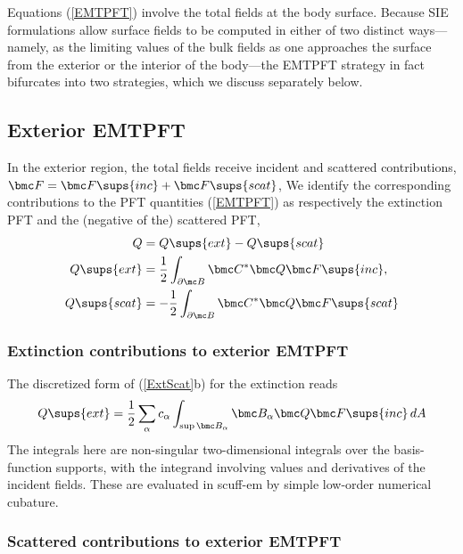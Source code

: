 Equations (\ref{EMTPFT}) involve the total fields at the
body surface. Because SIE formulations allow surface fields
to be computed in either of two distinct ways---namely, as the
limiting values of the bulk fields as one approaches the
surface from the exterior or the interior of the body---the
EMTPFT strategy in fact bifurcates into two strategies, which we 
discuss separately below.

\subsection{Exterior EMTPFT}

In the exterior region, the total fields receive
incident and scattered contributions,
$\bmc F = \bmc F\sups{inc} + \bmc F\sups{scat}$,
We identify the corresponding contributions to the
PFT quantities (\ref{EMTPFT}) as respectively the
extinction PFT and the (negative of the) scattered PFT,
\begin{subequations}
\begin{align}
 Q &= Q\sups{ext} - Q\sups{scat}
\\
 Q\sups{ext}&=\frac{1}{2}\int_{\partial \mc B}\bmc C^* \bmc Q \bmc F\sups{inc},
\\
 Q\sups{scat}&=-\frac{1}{2}\int_{\partial \mc B}\bmc C^* \bmc Q \bmc F\sups{scat}
\end{align}
\label{ExtScat}%
\end{subequations}

\subsubsection*{Extinction contributions to exterior EMTPFT}

The discretized form of (\ref{ExtScat}b) for the extinction reads
$$ Q\sups{ext}=
   \frac{1}{2}\sum_{\alpha} c_\alpha
   \int_{\sup \bmc B_\alpha} \bmc B_\alpha \bmc Q \bmc F\sups{inc} \, dA
$$
The integrals here are non-singular two-dimensional integrals over
the basis-function supports, with the integrand involving values 
and derivatives of the incident fields. These are evaluated 
in {\sc scuff-em} by simple low-order numerical cubature.

\subsubsection*{Scattered contributions to exterior EMTPFT}

